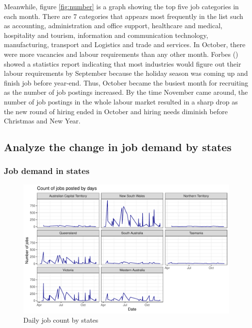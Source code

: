 \documentclass[11pt,a4paper,]{article}
\begin{document}
Meanwhile, figure \ref{fig:number} is a graph showing the top five job categories in each month. There are 7 categories that appears most frequently in the list such as accounting, administration and office support, healthcare and medical, hospitality and tourism, information and communication technology, manufacturing, transport and Logistics and trade and services. In October, there were more vacancies and labour requirements than any other month. Forbes (\textcite{Whitehead}) showed a statistics report indicating that most industries would figure out their labour requirements by September because the holiday season was coming up and finish job before year-end. Thus, October became the busiest month for recruiting as the number of job postings increased. By the time November came around, the number of job postings in the whole labour market resulted in a sharp drop as the new round of hiring ended in October and hiring needs diminish before Christmas and New Year.

\hypertarget{analyze-the-change-in-job-demand-by-states}{%
\subsection{Analyze the change in job demand by states}\label{analyze-the-change-in-job-demand-by-states}}

\hypertarget{job-demand-in-states}{%
\subsubsection{Job demand in states}\label{job-demand-in-states}}

\begin{figure}

{\centering \includegraphics{Team_JHDP_Assignment4_files/figure-latex/state-demand-1} 

}

\caption{Daily job count by states}\label{fig:state-demand}
\end{figure}
\end{document}
